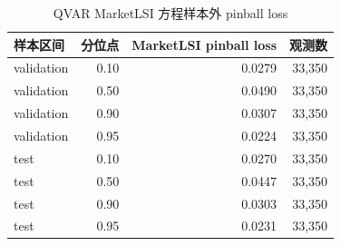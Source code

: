 \begin{table}[H]
\centering
\caption{QVAR MarketLSI 方程样本外 pinball loss}
\label{tab:qvar-pinball}
\small
\begin{tabular}{lrrr}
\toprule
样本区间 & 分位点 & MarketLSI pinball loss & 观测数 \\
\midrule
validation & 0.10 & 0.0279 & 33,350 \\
validation & 0.50 & 0.0490 & 33,350 \\
validation & 0.90 & 0.0307 & 33,350 \\
validation & 0.95 & 0.0224 & 33,350 \\
test & 0.10 & 0.0270 & 33,350 \\
test & 0.50 & 0.0447 & 33,350 \\
test & 0.90 & 0.0303 & 33,350 \\
test & 0.95 & 0.0231 & 33,350 \\
\bottomrule
\end{tabular}
\end{table}
